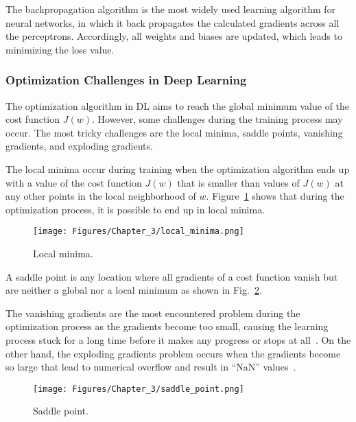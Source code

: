 The backpropagation algorithm is the most widely used learning algorithm for neural networks, in which it back propagates the calculated gradients across all the perceptrons.
Accordingly, all weights and biases are updated, which leads to minimizing the loss value.
\subsubsection{Optimization Challenges in Deep Learning}
The optimization algorithm in DL aims to reach the global minimum value of the cost function \(J(w)\).
However, some challenges during the training process may occur.
The most tricky challenges are the local minima, saddle points, vanishing gradients, and exploding gradients.

The local minima occur during training when the optimization algorithm ends up with a value of the cost function \(J(w)\) that is smaller than values of \(J(w)\) at any other points in the local neighborhood of \(w\).
Figure~\ref{fig:local_minima} shows that during the optimization process, it is possible to end up in local minima.
\begin{figure}[!ht]
	\begin{center}
		\centering
		\texttt{[image: Figures/Chapter\_3/local\_minima.png]}
	\end{center}
	\caption{Local minima.} 
	\label{fig:local_minima}
\end{figure}

A saddle point is any location where all gradients of a cost function vanish but are neither a global nor a local minimum as shown in Fig.~\ref{fig:saddle_point}.

The vanishing gradients are the most encountered problem during the optimization process as the gradients become too small, causing the learning process stuck for a long time before it makes any progress or stops at all~\cite{Brownlee2017a}.
On the other hand, the exploding gradients problem occurs when the gradients become so large that lead to numerical overflow and result in \enquote{NaN} values~\cite{Brownlee2017a}.
\begin{figure}[!ht]
	\begin{center}
		\centering
		\texttt{[image: Figures/Chapter\_3/saddle\_point.png]}
	\end{center}
	\caption{Saddle point.} 
	\label{fig:saddle_point}
\end{figure}
